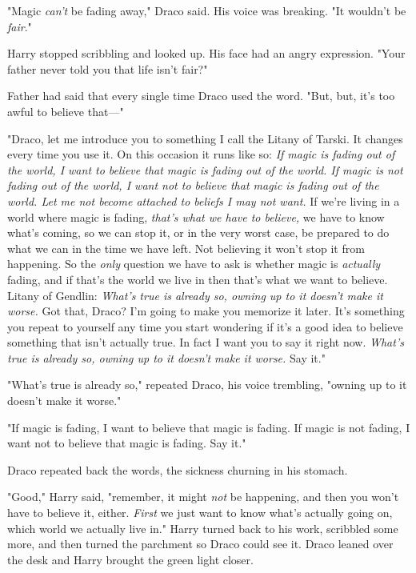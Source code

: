 "Magic \emph{can't} be fading away," Draco said. His voice was breaking. "It
wouldn't be \emph{fair}."

Harry stopped scribbling and looked up. His face had an angry expression. "Your
father never told you that life isn't fair?"

Father had said that every single time Draco used the word. "But, but, it's too
awful to believe that—"

"Draco, let me introduce you to something I call the Litany of Tarski. It
changes every time you use it. On this occasion it runs like so: \emph{If magic
is fading out of the world, I want to believe that magic is fading out of the
world. If magic is not fading out of the world, I want not to believe that
magic is fading out of the world. Let me not become attached to beliefs I may
not want.} If we're living in a world where magic is fading, \emph{that's what
we have to believe,} we have to know what's coming, so we can stop it, or in
the very worst case, be prepared to do what we can in the time we have left.
Not believing it won't stop it from happening. So the \emph{only} question we
have to ask is whether magic is \emph{actually} fading, and if that's the world
we live in then that's what we want to believe. Litany of Gendlin: \emph{What's
true is already so, owning up to it doesn't make it worse.} Got that, Draco?
I'm going to make you memorize it later. It's something you repeat to yourself
any time you start wondering if it's a good idea to believe something that
isn't actually true. In fact I want you to say it right now. \emph{What's true
is already so, owning up to it doesn't make it worse.} Say it."

"What's true is already so," repeated Draco, his voice trembling, "owning up to
it doesn't make it worse."

"If magic is fading, I want to believe that magic is fading. If magic is not
fading, I want not to believe that magic is fading. Say it."

Draco repeated back the words, the sickness churning in his stomach.

"Good," Harry said, "remember, it might \emph{not} be happening, and then you
won't have to believe it, either. \emph{First} we just want to know what's
actually going on, which world we actually live in." Harry turned back to his
work, scribbled some more, and then turned the parchment so Draco could see it.
Draco leaned over the desk and Harry brought the green light closer.

